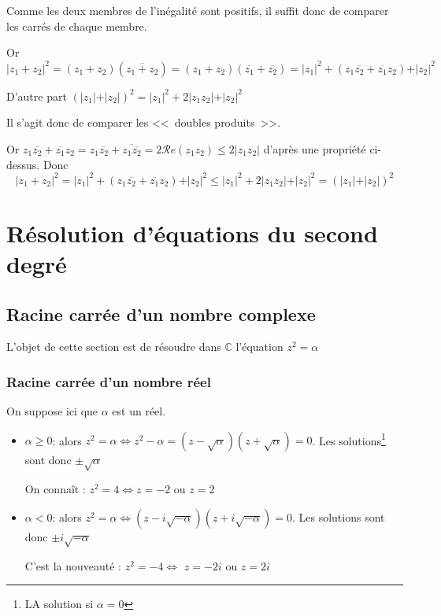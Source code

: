 \documentclass[french]{book}
\newcommand{\bbc}{\mathbb {C}}
\newcommand{\ab}[1]{\vert #1 \vert}
\newcommand{\se}{\geq}
\newcommand{\ie}{\leq}
\newcommand{\calr}{\mathscr{R}}
\newcommand{\RR}{\calr }
\newcommand{\pa}[1]{(#1)}
\newcommand{\al}{\alpha}
\newcommand{\ssi}{\Longleftrightarrow}
\newcommand{\cacher}[1]{#1}
\newcommand{\cacheb}[1]{#1}
\begin{document}
Comme les deux membres de l'inégalité sont positifs, il suffit donc de comparer les carrés de chaque membre.

Or
$\ab{z_1+z_2}^2=\pa{z_1+z_2}\pa{\overline{z_1+z_2}}=(z_1+z_2)\pa{\overline{z_1}+\overline{z_2}}=\ab{z_1}^2+\pa{z_1\overline{z_2} 
+\overline{z_1}z_2}+\ab{z_2}^2$


D'autre part $\pa{\ab{z_1}+\ab{z_2}}^2=\ab{z_1}^2+2\ab{z_1z_2}+\ab{z_2}^2$

Il s'agit donc de comparer les <<~doubles produits~>>.

Or                                                     $z_1\overline{z_2}
+\overline{z_1}z_2=z_1\overline{z_2}+\overline{z_1\overline{z_2}}=2\RR
e\pa{z_1z_2}\ie 2\ab{z_1z_2}$ d'après une propriété ci-dessus. Donc 
$$\ab{z_1+z_2}^2=\ab{z_1}^2+\pa{z_1\overline{z_2}
+\overline{z_1}z_2}+\ab{z_2}^2\ie\ab{z_1}^2+2\ab{z_1z_2}+\ab{z_2}^2=\pa{\ab{z_1}+\ab{z_2}}^2$$




\section{R\'esolution d'\'equations du second degr\'e}

\subsection{Racine carrée d'un nombre complexe}

L'objet de cette section est de résoudre dans $\bbc$ l'équation $z^2=\al$

\subsubsection{Racine carrée d'un nombre réel}

On suppose ici que $\al$ est un réel.


\begin{itemize}
\item[$\bullet$] \boldmath $\al\se 0$\unboldmath : alors $z^2=\al\ssi 
  z^2-\al=$\cacher{$(z-\sqrt{\al})(z+\sqrt{\al})=0$}.  Les 
  solutions\footnote{LA solution si $\al=0$} 
  sont donc \cacher{$\pm \sqrt{\al}$}


    \begin{exemple}[]
      On connaît : $z^2=4\ssi $\cacheb{$z=-2$} ou \cacheb{$z=2$}
      \end{exemple}
    



\item[$\bullet$]    \boldmath   $\al<    0$\unboldmath    :   alors    $z^2=\al\ssi
  (z-i\sqrt{-\al})(z+i\sqrt{-\al})=0$.  Les  solutions  sont  donc  $\pm
  i\sqrt{-\al}$ 


  
    \begin{exemple}[]
      C'est la nouveauté : $z^2=-4\ssi$ \cacheb{$z=-2i$} ou \cacheb{$z=2i$}
      \end{exemple}
    

\end{itemize}
\end{document}
